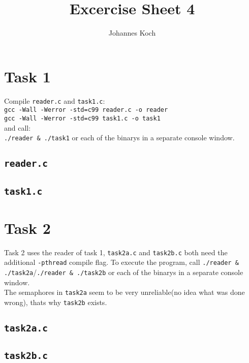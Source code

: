 \documentclass[11pt]{article} %
\title{Excercise Sheet 4}
\author{Johannes Koch}
\begin{document}
\maketitle

\section{Task 1}

Compile \texttt{reader.c} and \texttt{task1.c}:\\
\texttt{gcc -Wall -Werror -std=c99 reader.c -o reader}\\
\texttt{gcc -Wall -Werror -std=c99 task1.c -o task1}\\
and call:\\
\texttt{./reader \& ./task1} or each of the binarys in a separate console window.

\subsection{\texttt{reader.c}}


\subsection{\texttt{task1.c}}


\clearpage

\section{Task 2}
Task 2 uses the reader of task 1, \texttt{task2a.c} and \texttt{task2b.c}
both need the additional \texttt{-pthread} compile flag. To execute the program,
call \texttt{./reader \& ./task2a}/\texttt{./reader \& ./task2b} or each of the binarys
in a separate console window.\\
The semaphores in \texttt{task2a} seem to be very unreliable(no idea what was done wrong),
thats why \texttt{task2b} exists.

\subsection{\texttt{task2a.c}}


\subsection{\texttt{task2b.c}}

\end{document}
